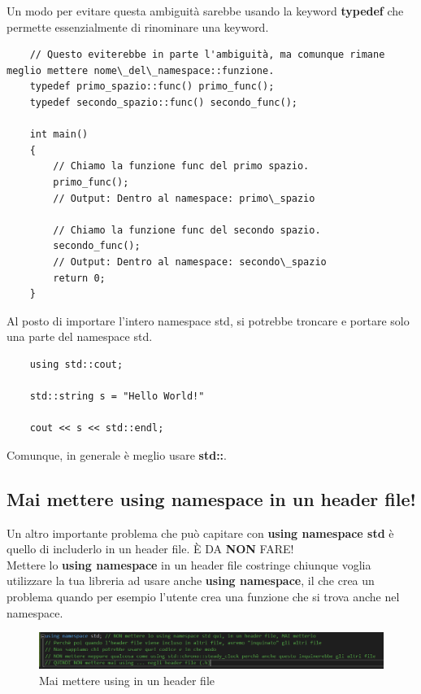 \textsf{\small Un modo per evitare questa ambiguità sarebbe usando la keyword \textbf{typedef} che permette essenzialmente di rinominare una keyword.}

\begin{lstlisting}
	// Questo eviterebbe in parte l'ambiguità, ma comunque rimane meglio mettere nome\_del\_namespace::funzione.
	typedef primo_spazio::func() primo_func();
	typedef secondo_spazio::func() secondo_func();
	
	int main()
	{
		// Chiamo la funzione func del primo spazio.
		primo_func();
		// Output: Dentro al namespace: primo\_spazio
		
		// Chiamo la funzione func del secondo spazio.
		secondo_func();
		// Output: Dentro al namespace: secondo\_spazio
		return 0;
	}
\end{lstlisting}

\textsf{\small Al posto di importare l'intero namespace std, si potrebbe troncare e portare solo una parte del namespace std.} \\

\begin{lstlisting}
	using std::cout;
	
	std::string s = "Hello World!"
	
	cout << s << std::endl;
\end{lstlisting}

\textsf{\small Comunque, in generale è meglio usare \textbf{std::}.} \\

\subsection{Mai mettere using namespace in un header file!}

\textsf{\small Un altro importante problema che può capitare con \textbf{using namespace std} è quello di includerlo in un header file. È DA \textbf{NON} FARE!} \\

\textsf{\small Mettere lo \textbf{using namespace} in un header file costringe chiunque voglia utilizzare la tua libreria ad usare anche \textbf{using namespace}, il che crea un problema quando per esempio l'utente crea una funzione che si trova anche nel namespace.}

\begin{figure}[ht]
	\centering
	\includegraphics[width=1.2\textwidth, height=1.2\textheight, keepaspectratio]{./imgs/MAI_mettere_USING_negli_header_files.png}
	\caption{Mai mettere using in un header file}
	\label{fig:never_using_in_header}
\end{figure}

